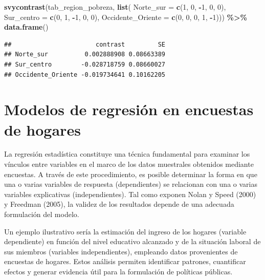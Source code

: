 \documentclass[
  12pt,
]{book}
\newenvironment{Shaded}{\begin{snugshade}}{\end{snugshade}}
\newcommand{\AttributeTok}[1]{\textcolor[rgb]{0.13,0.29,0.53}{#1}}
\newcommand{\DecValTok}[1]{\textcolor[rgb]{0.00,0.00,0.81}{#1}}
\newcommand{\FunctionTok}[1]{\textcolor[rgb]{0.13,0.29,0.53}{\textbf{#1}}}
\newcommand{\NormalTok}[1]{#1}
\newcommand{\SpecialCharTok}[1]{\textcolor[rgb]{0.81,0.36,0.00}{\textbf{#1}}}
\begin{document}
\begin{Shaded}
\begin{Highlighting}[]
\FunctionTok{svycontrast}\NormalTok{(tab\_region\_pobreza, }\FunctionTok{list}\NormalTok{(}
                \AttributeTok{Norte\_sur =} \FunctionTok{c}\NormalTok{(}\DecValTok{1}\NormalTok{, }\DecValTok{0}\NormalTok{, }\SpecialCharTok{{-}}\DecValTok{1}\NormalTok{, }\DecValTok{0}\NormalTok{, }\DecValTok{0}\NormalTok{),}
                \AttributeTok{Sur\_centro =} \FunctionTok{c}\NormalTok{(}\DecValTok{0}\NormalTok{, }\DecValTok{1}\NormalTok{, }\SpecialCharTok{{-}}\DecValTok{1}\NormalTok{, }\DecValTok{0}\NormalTok{, }\DecValTok{0}\NormalTok{),}
                \AttributeTok{Occidente\_Oriente =} \FunctionTok{c}\NormalTok{(}\DecValTok{0}\NormalTok{, }\DecValTok{0}\NormalTok{, }\DecValTok{0}\NormalTok{, }\DecValTok{1}\NormalTok{, }\SpecialCharTok{{-}}\DecValTok{1}\NormalTok{))) }\SpecialCharTok{\%\textgreater{}\%} \FunctionTok{data.frame}\NormalTok{()}
\end{Highlighting}
\end{Shaded}

\begin{verbatim}
##                       contrast         SE
## Norte_sur          0.002888908 0.08663389
## Sur_centro        -0.028718759 0.08660027
## Occidente_Oriente -0.019734641 0.10162205
\end{verbatim}

\section{Modelos de regresión en encuestas de hogares}\label{modelos-de-regresiuxf3n-en-encuestas-de-hogares}

La regresión estadística constituye una técnica fundamental para examinar los vínculos entre variables en el marco de los datos muestrales obtenidos mediante encuestas. A través de este procedimiento, es posible determinar la forma en que una o varias variables de respuesta (dependientes) se relacionan con una o varias variables explicativas (independientes). Tal como exponen Nolan y Speed (2000) y Freedman (2005), la validez de los resultados depende de una adecuada formulación del modelo.

Un ejemplo ilustrativo sería la estimación del ingreso de los hogares (variable dependiente) en función del nivel educativo alcanzado y de la situación laboral de sus miembros (variables independientes), empleando datos provenientes de encuestas de hogares. Estos análisis permiten identificar patrones, cuantificar efectos y generar evidencia útil para la formulación de políticas públicas.
\end{document}
